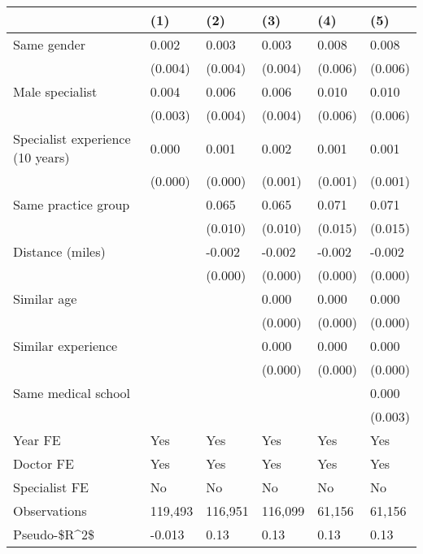 \begin{tabular}{llllll}
\hline
& (1) & (2) & (3) & (4) & (5) \\ \hline
Same gender                        & 0.002   & 0.003   & 0.003   & 0.008   & 0.008   \\
& (0.004) & (0.004) & (0.004) & (0.006) & (0.006) \\
Male specialist                    & 0.004   & 0.006   & 0.006   & 0.010   & 0.010   \\
& (0.003) & (0.004) & (0.004) & (0.006) & (0.006) \\
Specialist experience (10 years)   & 0.000   & 0.001   & 0.002   & 0.001   & 0.001   \\
& (0.000) & (0.000) & (0.001) & (0.001) & (0.001) \\
Same practice group                &         & 0.065   & 0.065   & 0.071   & 0.071   \\
&         & (0.010) & (0.010) & (0.015) & (0.015) \\
Distance (miles)                   &         & -0.002  & -0.002  & -0.002  & -0.002  \\
&         & (0.000) & (0.000) & (0.000) & (0.000) \\
Similar age                        &         &         & 0.000   & 0.000   & 0.000   \\
&         &         & (0.000) & (0.000) & (0.000) \\
Similar experience                 &         &         & 0.000   & 0.000   & 0.000   \\
&         &         & (0.000) & (0.000) & (0.000) \\
Same medical school                &         &         &         &         & 0.000   \\
&         &         &         &         & (0.003) \\
Year FE                            & Yes     & Yes     & Yes     & Yes     & Yes     \\
Doctor FE                          & Yes     & Yes     & Yes     & Yes     & Yes     \\
Specialist FE                      & No      & No      & No      & No      & No      \\
Observations                       & 119,493 & 116,951 & 116,099 & 61,156  & 61,156  \\
Pseudo-\$R\textasciicircum{}2\$ & -0.013  & 0.13    & 0.13    & 0.13    & 0.13    \\
\hline
\end{tabular}
